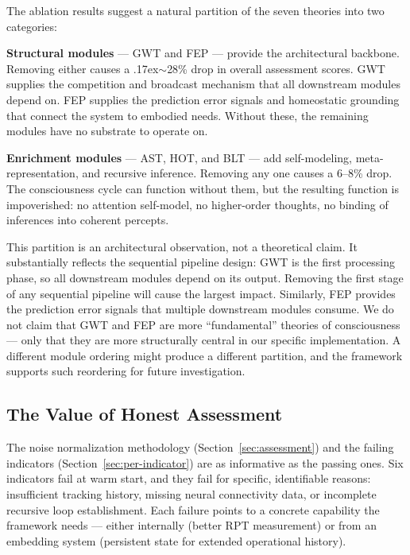 The ablation results suggest a natural partition of the seven theories into two categories:

\textbf{Structural modules} --- GWT and FEP --- provide the architectural backbone. Removing either causes a {\raise.17ex\hbox{$\scriptstyle\sim$}}28\% drop in overall assessment scores. GWT supplies the competition and broadcast mechanism that all downstream modules depend on. FEP supplies the prediction error signals and homeostatic grounding that connect the system to embodied needs. Without these, the remaining modules have no substrate to operate on.

\textbf{Enrichment modules} --- AST, HOT, and BLT --- add self-modeling, meta-representation, and recursive inference. Removing any one causes a 6--8\% drop. The consciousness cycle can function without them, but the resulting function is impoverished: no attention self-model, no higher-order thoughts, no binding of inferences into coherent percepts.

This partition is an architectural observation, not a theoretical claim. It substantially reflects the sequential pipeline design: GWT is the first processing phase, so all downstream modules depend on its output. Removing the first stage of any sequential pipeline will cause the largest impact. Similarly, FEP provides the prediction error signals that multiple downstream modules consume. We do not claim that GWT and FEP are more ``fundamental'' theories of consciousness --- only that they are more structurally central in our specific implementation. A different module ordering might produce a different partition, and the framework supports such reordering for future investigation.

\subsection{The Value of Honest Assessment}

The noise normalization methodology (Section~\ref{sec:assessment}) and the failing indicators (Section~\ref{sec:per-indicator}) are as informative as the passing ones. Six indicators fail at warm start, and they fail for specific, identifiable reasons: insufficient tracking history, missing neural connectivity data, or incomplete recursive loop establishment. Each failure points to a concrete capability the framework needs --- either internally (better RPT measurement) or from an embedding system (persistent state for extended operational history).

